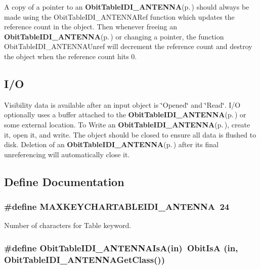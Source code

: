 A copy of a pointer to an {\bf Obit\-Table\-IDI\_\-ANTENNA}{\rm (p.\,\pageref{structObitTableIDI__ANTENNA})} should always be made using the Obit\-Table\-IDI\_\-ANTENNARef function which updates the reference count in the object. Then whenever freeing an {\bf Obit\-Table\-IDI\_\-ANTENNA}{\rm (p.\,\pageref{structObitTableIDI__ANTENNA})} or changing a pointer, the function Obit\-Table\-IDI\_\-ANTENNAUnref will decrement the reference count and destroy the object when the reference count hits 0.\subsection{I/O}\label{ObitTableIDI__ANTENNA_8h_ObitTableIDI_ANTENNAUsage}
Visibility data is available after an input object is \char`\"{}Opened\char`\"{} and \char`\"{}Read\char`\"{}. I/O optionally uses a buffer attached to the {\bf Obit\-Table\-IDI\_\-ANTENNA}{\rm (p.\,\pageref{structObitTableIDI__ANTENNA})} or some external location. To Write an {\bf Obit\-Table\-IDI\_\-ANTENNA}{\rm (p.\,\pageref{structObitTableIDI__ANTENNA})}, create it, open it, and write. The object should be closed to ensure all data is flushed to disk. Deletion of an {\bf Obit\-Table\-IDI\_\-ANTENNA}{\rm (p.\,\pageref{structObitTableIDI__ANTENNA})} after its final unreferencing will automatically close it.

\subsection{Define Documentation}
\subsubsection{\setlength{\rightskip}{0pt plus 5cm}\#define MAXKEYCHARTABLEIDI\_\-ANTENNA\ 24}\label{ObitTableIDI__ANTENNA_8h_a0}


Number of characters for Table keyword. 

\subsubsection{\setlength{\rightskip}{0pt plus 5cm}\#define Obit\-Table\-IDI\_\-ANTENNAIs\-A(in)\ Obit\-Is\-A (in, Obit\-Table\-IDI\_\-ANTENNAGet\-Class())}\label{ObitTableIDI__ANTENNA_8h_a3}



